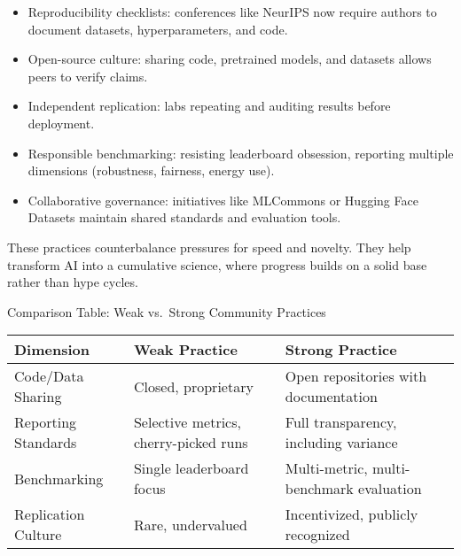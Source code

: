 \documentclass[
  letterpaper,
  DIV=11,
  numbers=noendperiod]{scrreprt}
\providecommand{\tightlist}{%
  \setlength{\itemsep}{0pt}\setlength{\parskip}{0pt}}
\begin{document}
\begin{itemize}
\tightlist
\item
  Reproducibility checklists: conferences like NeurIPS now require
  authors to document datasets, hyperparameters, and code.
\item
  Open-source culture: sharing code, pretrained models, and datasets
  allows peers to verify claims.
\item
  Independent replication: labs repeating and auditing results before
  deployment.
\item
  Responsible benchmarking: resisting leaderboard obsession, reporting
  multiple dimensions (robustness, fairness, energy use).
\item
  Collaborative governance: initiatives like MLCommons or Hugging Face
  Datasets maintain shared standards and evaluation tools.
\end{itemize}

These practices counterbalance pressures for speed and novelty. They
help transform AI into a cumulative science, where progress builds on a
solid base rather than hype cycles.

Comparison Table: Weak vs.~Strong Community Practices

\begin{longtable}[]{@{}
  >{\raggedright\arraybackslash}p{}
  >{\raggedright\arraybackslash}p{}
  >{\raggedright\arraybackslash}p{}@{}}
\toprule\noalign{}
\begin{minipage}[b]{\linewidth}\raggedright
Dimension
\end{minipage} & \begin{minipage}[b]{\linewidth}\raggedright
Weak Practice
\end{minipage} & \begin{minipage}[b]{\linewidth}\raggedright
Strong Practice
\end{minipage} \\
\midrule\noalign{}
\endhead
\bottomrule\noalign{}
\endlastfoot
Code/Data Sharing & Closed, proprietary & Open repositories with
documentation \\
Reporting Standards & Selective metrics, cherry-picked runs & Full
transparency, including variance \\
Benchmarking & Single leaderboard focus & Multi-metric, multi-benchmark
evaluation \\
Replication Culture & Rare, undervalued & Incentivized, publicly
recognized \\
\end{longtable}
\end{document}
